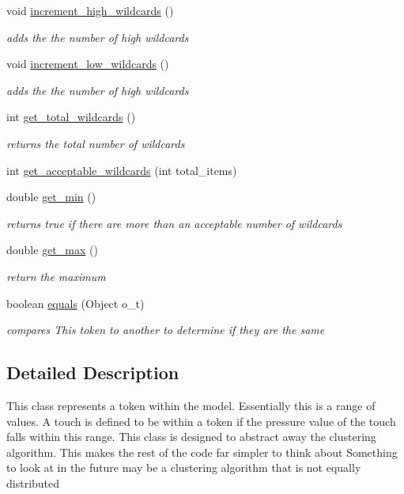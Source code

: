 \begin{DoxyCompactItemize}
void \hyperlink{classcomponents_1_1_token_adb18305be1ee0eb86e7a27b59d62a3ab}{increment\+\_\+high\+\_\+wildcards} ()
\begin{DoxyCompactList}\small\item\em adds the the number of high wildcards \end{DoxyCompactList}\item 
void \hyperlink{classcomponents_1_1_token_aedf81a3bafbf9843754192a5f287a06d}{increment\+\_\+low\+\_\+wildcards} ()
\begin{DoxyCompactList}\small\item\em adds the the number of high wildcards \end{DoxyCompactList}\item 
int \hyperlink{classcomponents_1_1_token_a08348f7ec1a53d80f8886cca07e70e97}{get\+\_\+total\+\_\+wildcards} ()
\begin{DoxyCompactList}\small\item\em returns the total number of wildcards \end{DoxyCompactList}\item 
int \hyperlink{classcomponents_1_1_token_a1f4fc1f480c23dcd8bc00a43b34ed613}{get\+\_\+acceptable\+\_\+wildcards} (int total\+\_\+items)
\item 
double \hyperlink{classcomponents_1_1_token_a7139374ae5d36699d9d0b2e80d9afde7}{get\+\_\+min} ()
\begin{DoxyCompactList}\small\item\em returns true if there are more than an acceptable number of wildcards \end{DoxyCompactList}\item 
double \hyperlink{classcomponents_1_1_token_a200e957fcc13ec21353edc5e4510cf67}{get\+\_\+max} ()
\begin{DoxyCompactList}\small\item\em return the maximum \end{DoxyCompactList}\item 
boolean \hyperlink{classcomponents_1_1_token_a9d029725d9c98ef58017aee36be0989d}{equals} (Object o\+\_\+t)
\begin{DoxyCompactList}\small\item\em compares This token to another to determine if they are the same \end{DoxyCompactList}\end{DoxyCompactItemize}


\subsection{Detailed Description}
This class represents a token within the model. Essentially this is a range of values. A touch is defined to be within a token if the pressure value of the touch falls within this range. This class is designed to abstract away the clustering algorithm. This makes the rest of the code far simpler to think about Something to look at in the future may be a clustering algorithm that is not equally distributed 

